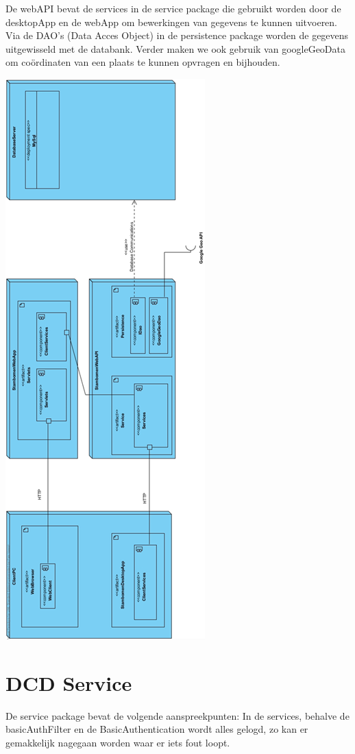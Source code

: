 \documentclass[pdftex,a4paper,12pt,twoside]{report}
\begin{document}
De webAPI bevat de services in de service package die gebruikt worden door de desktopApp en de webApp om bewerkingen van gegevens te kunnen uitvoeren. Via de DAO’s (Data Acces Object) in de persistence package worden de gegevens uitgewisseld met de databank.
Verder maken we ook gebruik van googleGeoData om coördinaten van een plaats te kunnen opvragen en bijhouden.
\begin{center}
\includegraphics[height=\textheight]{images/deploymentdiagram.png}\\
\end{center}

\section{DCD Service}
De service package bevat de volgende aanspreekpunten:
In de services, behalve de basicAuthFilter en de BasicAuthentication wordt alles gelogd, zo kan er gemakkelijk nagegaan worden waar er iets fout loopt.
\end{document}
